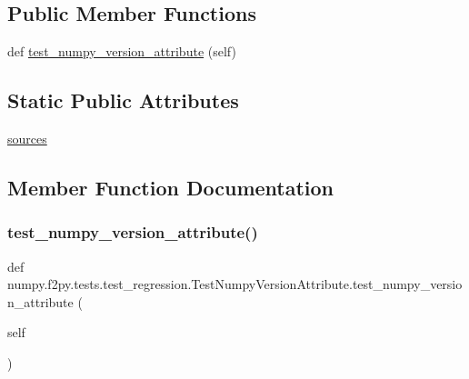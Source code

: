 \subsection*{Public Member Functions}
\begin{DoxyCompactItemize}
\item 
def \hyperlink{classnumpy_1_1f2py_1_1tests_1_1test__regression_1_1TestNumpyVersionAttribute_a8512d61ece88f2d4668a36bb75174445}{test\+\_\+numpy\+\_\+version\+\_\+attribute} (self)
\end{DoxyCompactItemize}
\subsection*{Static Public Attributes}
\begin{DoxyCompactItemize}
\item 
\hyperlink{classnumpy_1_1f2py_1_1tests_1_1test__regression_1_1TestNumpyVersionAttribute_af4888b5c20b796d2d082a30d30ca6a5c}{sources}
\end{DoxyCompactItemize}


\subsection{Member Function Documentation}
\mbox{\label{classnumpy_1_1f2py_1_1tests_1_1test__regression_1_1TestNumpyVersionAttribute_a8512d61ece88f2d4668a36bb75174445}} 
\subsubsection{\texorpdfstring{test\+\_\+numpy\+\_\+version\+\_\+attribute()}{test\_numpy\_version\_attribute()}}
{\footnotesize\ttfamily def numpy.\+f2py.\+tests.\+test\+\_\+regression.\+Test\+Numpy\+Version\+Attribute.\+test\+\_\+numpy\+\_\+version\+\_\+attribute (\begin{DoxyParamCaption}\item[{}]{self }\end{DoxyParamCaption})}



